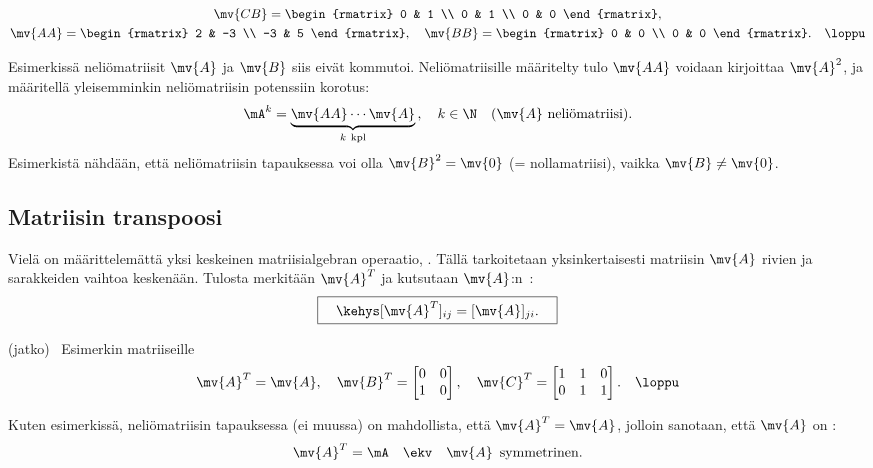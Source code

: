 \begin{Exa}
\begin{gather*}
\mv{CB} = \begin{rmatrix} 0 & 1 \\ 0 & 1 \\ 0 & 0 \end{rmatrix}, \\
\mv{AA} = \begin{rmatrix} 2 & -3 \\ -3 & 5 \end{rmatrix}, \quad 
\mv{BB} = \begin{rmatrix} 0 & 0 \\ 0 & 0 \end{rmatrix}. \quad \loppu
\end{gather*}                            
\end{Exa}

Esimerkissä neliömatriisit $\mv{A}$ ja $\mv{B}$ siis eivät kommutoi. Neliömatriisille määritelty
tulo $\mv{AA}$ voidaan kirjoittaa  $\mv{A}^2$, ja määritellä yleisemminkin neliömatriisin 
potenssiin korotus:
\[ 
\mA^k = \underbrace{\mv{AA} \cdots \mv{A}}_{k\ \text{kpl}}\,, \quad 
                         k \in \N \quad (\text{$\mv{A}$ neliömatriisi}). 
\]
Esimerkistä nähdään, että neliömatriisin tapauksessa voi olla $\mv{B}^2 = \mv{0}$ 
(= nollamatriisi), vaikka $\mv{B} \neq \mv{0}$.

\subsection*{Matriisin transpoosi}

Vielä on määrittelemättä yksi keskeinen matriisialgebran operaatio,
%
. Tällä tarkoitetaan yksinkertaisesti matriisin $\mv{A}$ rivien ja
sarakkeiden vaihtoa keskenään. Tulosta merkitään $\mv{A}^T$ ja kutsutaan $\mv{A}$:n
\,:
\[ 
\boxed{ \quad \kehys [\mv{A}^T]_{ij} = [\mv{A}]_{ji}. \quad } 
\]
\jatko \begin{Exa} (jatko) \ Esimerkin matriiseille
\[ 
\mv{A}^T = \mv{A}, \quad \mv{B}^T = \begin{bmatrix} 0 & 0 \\ 1 & 0 \end{bmatrix}, \quad
\mv{C}^T = \begin{bmatrix} 1 & 1 & 0 \\ 0 & 1 & 1 \end{bmatrix}. \quad \loppu
\] 
\end{Exa}
Kuten esimerkissä, neliömatriisin tapauksessa (ei muussa) on mahdollista, että 
$\mv{A}^T = \mv{A}$, jolloin sanotaan, että $\mv{A}$ on :
\[ 
\mv{A}^T = \mA \quad \ekv \quad \mv{A}\,\ \text{symmetrinen}. 
\]


